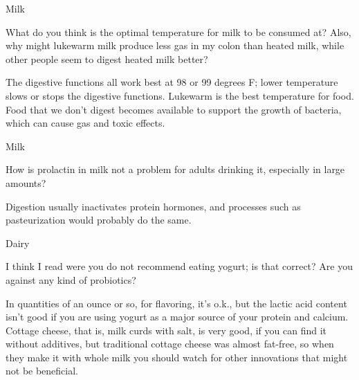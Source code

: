 \documentclass[11pt,oneside,openany,extrafontsizes]{memoir}
\begin{document}
\begin{qaexchange}{Milk}

    \begin{question}
        What do you think is the optimal temperature for milk to be consumed at? Also, why might lukewarm milk produce less gas in my colon than heated milk, while other people seem to digest heated milk better?
    \end{question}

    \begin{answer}
        The digestive functions all work best at 98 or 99 degrees F; lower temperature slows or stops the digestive functions. Lukewarm is the best temperature for food. Food that we don't digest becomes available to support the growth of bacteria, which can cause gas and toxic effects.
    \end{answer}
\end{qaexchange}

\begin{qaexchange}{Milk}

    \begin{question}
        How is prolactin in milk not a problem for adults drinking it, especially in large amounts?
    \end{question}

    \begin{answer}
        Digestion usually inactivates protein hormones, and processes such as pasteurization would probably do the same.
    \end{answer}
\end{qaexchange}

\begin{qaexchange}{Dairy}

    \begin{question}
        I think I read were you do not recommend eating yogurt; is that correct? Are you against any kind of probiotics?
    \end{question}

    \begin{answer}
        In quantities of an ounce or so, for flavoring, it's o.k., but the lactic acid content isn't good if you are using yogurt as a major source of your protein and calcium. Cottage cheese, that is, milk curds with salt, is very good, if you can find it without additives, but traditional cottage cheese was almost fat-free, so when they make it with whole milk you should watch for other innovations that might not be beneficial.
    \end{answer}
\end{qaexchange}
\end{document}
